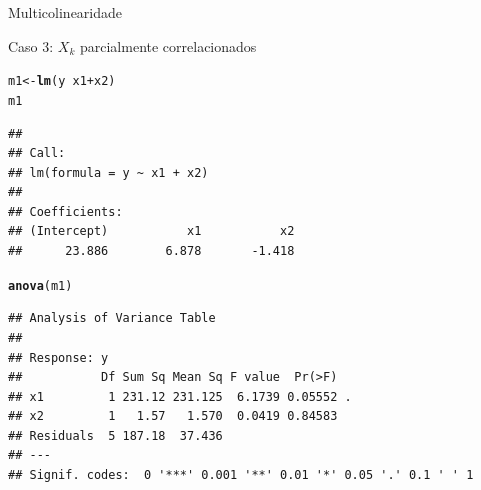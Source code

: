 \documentclass{beamer}\usepackage[]{graphicx}\usepackage[]{color}
\makeatletter
\newcommand{\hlopt}[1]{\textcolor[rgb]{0,0,0}{#1}}%
\newcommand{\hlstd}[1]{\textcolor[rgb]{0.345,0.345,0.345}{#1}}%
\newcommand{\hlkwb}[1]{\textcolor[rgb]{0.69,0.353,0.396}{#1}}%
\newcommand{\hlkwd}[1]{\textcolor[rgb]{0.737,0.353,0.396}{\textbf{#1}}}%
\newenvironment{kframe}{%
 \def\at@end@of@kframe{}%
 \ifinner\ifhmode%
  \def\at@end@of@kframe{\end{minipage}}%
  \begin{minipage}{\columnwidth}%
 \fi\fi%
 \def\FrameCommand##1{\hskip\@totalleftmargin \hskip-\fboxsep
 \colorbox{shadecolor}{##1}\hskip-\fboxsep
     \hskip-\linewidth \hskip-\@totalleftmargin \hskip\columnwidth}%
 \MakeFramed {\advance\hsize-\width
   \@totalleftmargin\z@ \linewidth\hsize
   \@setminipage}}%
 {\par\unskip\endMakeFramed%
 \at@end@of@kframe}
\newenvironment{knitrout}{}{} %
\renewenvironment{knitrout}{\setlength{\topsep}{0mm}}{}
\makeatother
\begin{document}
\begin{frame}[fragile]{Multicolinearidade}

Caso 3: $X_k$ parcialmente correlacionados
\vfill

\begin{knitrout}\tiny
{}\color{fgcolor}\begin{kframe}
\begin{alltt}
\hlstd{m1} \hlkwb{<-} \hlkwd{lm}\hlstd{(y} \hlopt{~} \hlstd{x1} \hlopt{+} \hlstd{x2)}
\hlstd{m1}
\end{alltt}
\begin{verbatim}
## 
## Call:
## lm(formula = y ~ x1 + x2)
## 
## Coefficients:
## (Intercept)           x1           x2  
##      23.886        6.878       -1.418
\end{verbatim}
\begin{alltt}
\hlkwd{anova}\hlstd{(m1)}
\end{alltt}
\begin{verbatim}
## Analysis of Variance Table
## 
## Response: y
##           Df Sum Sq Mean Sq F value  Pr(>F)  
## x1         1 231.12 231.125  6.1739 0.05552 .
## x2         1   1.57   1.570  0.0419 0.84583  
## Residuals  5 187.18  37.436                  
## ---
## Signif. codes:  0 '***' 0.001 '**' 0.01 '*' 0.05 '.' 0.1 ' ' 1
\end{verbatim}
\end{kframe}
\end{knitrout}

\end{frame}
\end{document}
